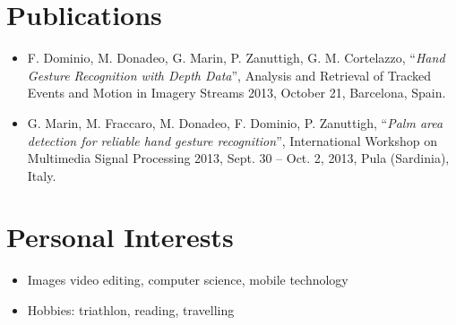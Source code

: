 \documentclass[pdftex,a4paper,10pt,twoside,titlepage]{article}
\begin{document}
\section*{Publications}
\begin{itemize}
\item F. Dominio, M. Donadeo, G. Marin, P. Zanuttigh, G. M. Cortelazzo, ``\textit{Hand Gesture Recognition with Depth Data}'', Analysis and Retrieval of Tracked Events and Motion in Imagery Streams 2013, October 21, Barcelona, Spain.
\item G. Marin, M. Fraccaro, M. Donadeo, F. Dominio, P. Zanuttigh, ``\textit{Palm area detection for reliable hand gesture recognition}'', International Workshop on Multimedia Signal Processing 2013, Sept. 30 – Oct. 2, 2013, Pula (Sardinia), Italy.
\end{itemize}
\section*{Personal Interests}
\begin{itemize}
	\item Images video  editing, computer science, mobile technology
	\item Hobbies: triathlon, reading, travelling
\end{itemize}
\vfill
\vspace{1cm}
\end{document}
